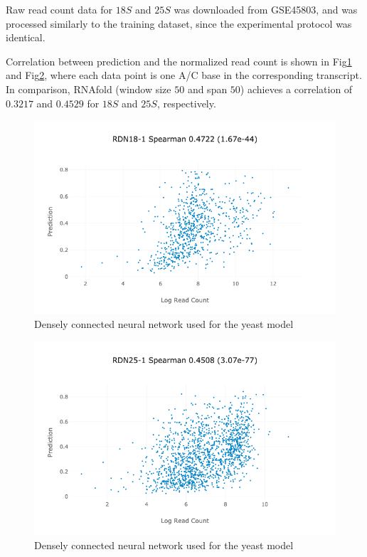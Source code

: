 \documentclass{proposal}
\begin{document}
Raw read count data for $18S$ and $25S$ was downloaded from GSE45803, and was processed similarly to the training dataset,
since the experimental protocol was identical.

Correlation between prediction and the normalized read count is shown in Fig\ref{fig:yeast_r18_performance} and Fig\ref{fig:yeast_r25_performance},
where each data point is one A/C base in the corresponding transcript.
In comparison, RNAfold (window size $50$ and span $50$) achieves a correlation of $0.3217$ and $0.4529$ for $18S$ and $25S$, respectively.

\begin{figure}[h!]
\includegraphics[width=\textwidth]{yeast_r18_performance.png}
\caption{Densely connected neural network used for the yeast model}
\label{fig:yeast_r18_performance}
\centering
\end{figure}

\begin{figure}[h!]
\includegraphics[width=\textwidth]{yeast_r25_performance.png}
\caption{Densely connected neural network used for the yeast model}
\label{fig:yeast_r25_performance}
\centering
\end{figure}
\end{document}

